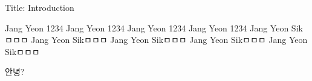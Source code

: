 Title: Introduction


Jang Yeon 1234
Jang Yeon 1234
Jang Yeon 1234
Jang Yeon 1234
Jang Yeon Sikㅁㅁㅁ
Jang Yeon Sikㅁㅁㅁ
Jang Yeon Sikㅁㅁㅁ
Jang Yeon Sikㅁㅁㅁ
Jang Yeon Sikㅁㅁㅁ





안녕?